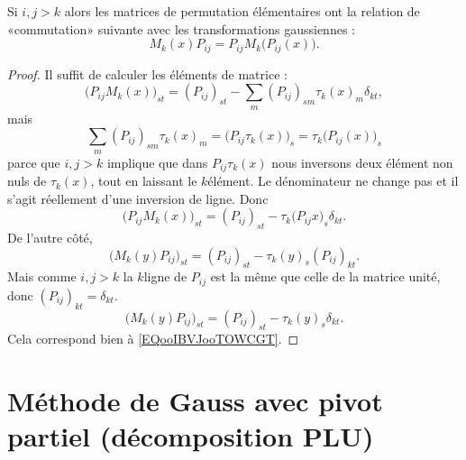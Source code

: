 \begin{lemma}        \label{LEMooYIYIooYhnaOt}
    Si \( i,j>k\) alors les matrices de permutation élémentaires ont la relation de «commutation» suivante avec les transformations gaussiennes :
    \begin{equation}
        M_k(x)P_{ij}=P_{ij}M_k\big(  P_{ij}(x) \big).
    \end{equation}
\end{lemma}

\begin{proof}
    Il suffit de calculer les éléments de matrice :
    \begin{equation}
        \big( P_{ij}M_k(x) \big)_{st}=(P_{ij})_{st}-\sum_m(P_{ij})_{sm}\tau_k(x)_{m}\delta_{kt},
    \end{equation}
    mais
    \begin{equation}
        \sum_m(P_{ij})_{sm}\tau_k(x)_{m}=\big( P_{ij}\tau_k(x) \big)_s=\tau_k\big( P_{ij}(x) \big)_s
    \end{equation}
    parce que \( i,j>k\) implique que dans \( P_{ij}\tau_k(x)\) nous inversons deux élément non nuls de \( \tau_k(x)\), tout en laissant le \( k\)\ieme élément. Le dénominateur ne change pas et il s'agit réellement d'une inversion de ligne. Donc
    \begin{equation}        \label{EQooIBVJooTOWCGT}
        \big( P_{ij}M_k(x) \big)_{st}=(P_{ij})_{st}-\tau_k\big( P_{ij}x \big)_s\delta_{kt}.
    \end{equation}
    De l'autre côté,
    \begin{equation}
        \big( M_k(y)P_{ij} \big)_{st}=(P_{ij})_{st}-\tau_k(y)_s(P_{ij})_{kt}.
    \end{equation}
    Mais comme \( i,j>k\) la \( k\)\ieme ligne de \( P_{ij}\) est la même que celle de la matrice unité, donc \( (P_{ij})_{kt}=\delta_{kt}\).
    \begin{equation}
        \big( M_k(y)P_{ij} \big)_{st}=(P_{ij})_{st}-\tau_k(y)_s\delta_{kt}.
    \end{equation}
    Cela correspond bien à \eqref{EQooIBVJooTOWCGT}.
\end{proof}

\section{Méthode de Gauss avec pivot partiel (décomposition PLU)}

